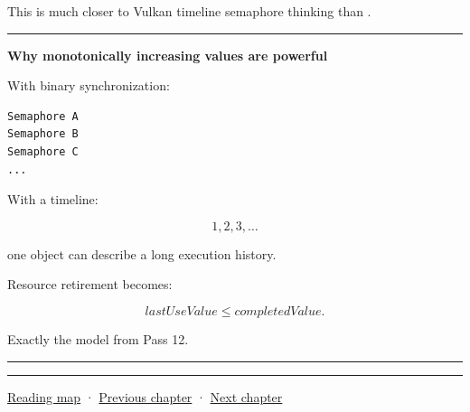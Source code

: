 This is much closer to Vulkan timeline semaphore thinking than .

\begin{center}\rule{0.5\linewidth}{0.5pt}\end{center}

\textbf{Why monotonically increasing values are powerful}

With binary synchronization:

\begin{verbatim}
Semaphore A
Semaphore B
Semaphore C
...
\end{verbatim}

With a timeline:

\[
1,2,3,\dots
\]

one object can describe a long execution history.

Resource retirement becomes:

\[
lastUseValue
\le
completedValue.
\]

Exactly the model from Pass 12.

\begin{center}\rule{0.5\linewidth}{0.5pt}\end{center}

\begin{center}\rule{0.5\linewidth}{0.5pt}\end{center}

\hyperref[volume-reading-map]{Reading map} · \hyperref[05-engine-i-ch022-vulkan-synchronization-and-multi-frame-lifetimes]{Previous chapter} · \hyperref[05-engine-i-ch024-profiling-and-languageplatform-ownership]{Next chapter}
